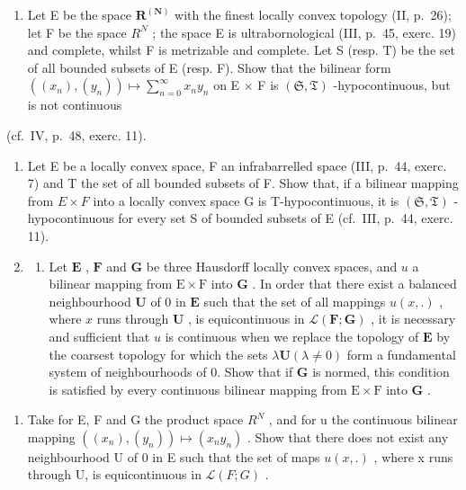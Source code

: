 \begin{enumerate}
\def\labelenumi{\arabic{enumi})}
\setcounter{enumi}{2}
\tightlist
\item
  Let E be the space \(\mathbf{R}^{(\mathbf{N})}\) with the finest locally convex topology (II, p.~26); let F be the space \(R^{N}\) ; the space E is ultrabornological (III, p.~45, exerc. 19) and complete, whilst F is metrizable and complete. Let S (resp. T) be the set of all bounded subsets of E (resp. F). Show that the bilinear form \(((x_{n}), (y_{n})) \mapsto \sum_{n=0}^{\infty} x_{n} y_{n}\) on E × F is \((\mathfrak{S}, \mathfrak{T})\) -hypocontinuous, but is not continuous
\end{enumerate}

(cf.~IV, p.~48, exerc. 11).

\begin{enumerate}
\def\labelenumi{\arabic{enumi})}
\setcounter{enumi}{3}
\item
  Let E be a locally convex space, F an infrabarrelled space (III, p.~44, exerc. 7) and T the set of all bounded subsets of F. Show that, if a bilinear mapping from \(E \times F\) into a locally convex space G is T-hypocontinuous, it is \((\mathfrak{S}, \mathfrak{T})\) -hypocontinuous for every set S of bounded subsets of E (cf.~III, p.~44, exerc. 11).
\item
  \begin{enumerate}
  \def\labelenumii{\alph{enumii})}
  \tightlist
  \item
    Let \(\mathbf{E}\) , \(\mathbf{F}\) and \(\mathbf{G}\) be three Hausdorff locally convex spaces, and \(u\) a bilinear mapping from \(\mathrm{E} \times \mathrm{F}\) into \(\mathbf{G}\) . In order that there exist a balanced neighbourhood \(\mathbf{U}\) of 0 in \(\mathbf{E}\) such that the set of all mappings \(u(x, .)\) , where \(x\) runs through \(\mathbf{U}\) , is equicontinuous in \(\mathcal{L}(\mathbf{F}; \mathbf{G})\) , it is necessary and sufficient that \(u\) is continuous when we replace the topology of \(\mathbf{E}\) by the coarsest topology for which the sets \(\lambda \mathbf{U} (\lambda \neq 0)\) form a fundamental system of neighbourhoods of 0. Show that if \(\mathbf{G}\) is normed, this condition is satisfied by every continuous bilinear mapping from \(\mathrm{E} \times \mathrm{F}\) into \(\mathbf{G}\) .
  \end{enumerate}
\end{enumerate}

\begin{enumerate}
\def\labelenumi{\alph{enumi})}
\setcounter{enumi}{1}
\tightlist
\item
  Take for E, F and G the product space \(R^{N}\) , and for u the continuous bilinear mapping \(((x_{n}), (y_{n})) \mapsto (x_{n}y_{n})\) . Show that there does not exist any neighbourhood U of 0 in E such that the set of maps \(u(x, .)\) , where x runs through U, is equicontinuous in \(\mathcal{L}(F; G)\) .
\end{enumerate}

